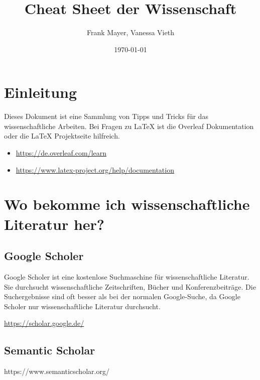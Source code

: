 \documentclass[11pt]{article}
\begin{document}
	\title{Cheat Sheet der Wissenschaft}
	\author{Frank Mayer, Vanessa Vieth}
	\date{\today}
	\maketitle
	\tableofcontents

	\pagebreak

	\section{Einleitung}
	Dieses Dokument ist eine Sammlung von Tipps und Tricks für das wissenschaftliche Arbeiten.
	Bei Fragen zu \LaTeX{} ist die Overleaf Dokumentation oder die \LaTeX{} Projektseite hilfreich.
	\begin{itemize}
		\item \href{https://de.overleaf.com/learn}{https://de.overleaf.com/learn}
		\item \href{https://www.latex-project.org/help/documentation/}{https://www.latex-project.org/help/documentation}
	\end{itemize}

	\section{Wo bekomme ich wissenschaftliche Literatur her?}
	\subsection{Google Scholer}
	Google Scholer ist eine kostenlose Suchmaschine für wissenschaftliche Literatur. Sie durchsucht wissenschaftliche Zeitschriften, Bücher und Konferenzbeiträge. Die Suchergebnisse sind oft besser als bei der normalen Google-Suche, da Google Scholer nur wissenschaftliche Literatur durchsucht. \cite{halevi2017suitability}

	\href{htts://scholar.google.de/}{https://scholar.google.de/}

	\subsection{Semantic Scholar}
	https://www.semanticscholar.org/

	\pagebreak

	{}
	
\end{document}
